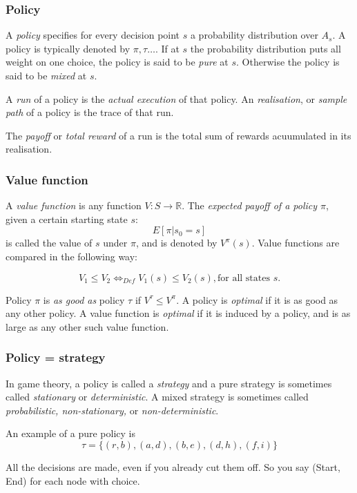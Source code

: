 \documentclass{article}
\begin{document}
\subsubsection{Policy}
A \emph{policy} specifies for every decision point $s$ a probability
distribution over $A_s$. A policy is typically denoted by $\pi, \tau\dots$.
If at $s$ the probability distribution puts all weight on one choice, the
policy is said to be \emph{pure} at $s$. Otherwise the policy is said to
be \emph{mixed} at $s$.

A \emph{run} of a policy is the \emph{actual execution} of that policy.
An \emph{realisation}, or \emph{sample path} of a policy is the trace of
that run.

The \emph{payoff} or \emph{total reward} of a run is the total sum of rewards
acuumulated in its realisation.

\subsubsection{Value function}
A \emph{value function} is any function $V: S \to \mathbb{R}$. The
\emph{expected payoff of a policy $\pi$}, given a certain starting state $s$:
	\[E[\pi|s_0=s]\]
	is called the value of $s$ under $\pi$, and is denoted by $V^\pi(s)$.
Value functions are compared in the following way:

\[ V_1 \le V_2 \Leftrightarrow_{Def} V_1(s) \le V_2(s), \mbox{for all states } s.\]

Policy $\pi$ is \emph{as good as} policy $\tau$ if $V^\tau \le V^\pi$. A policy
is \emph{optimal} if it is as good as any other policy. A value function is
\emph{optimal} if it is induced by a policy, and is as large as any other
such value function.

\subsubsection{Policy = strategy}
In game theory, a policy is called a \emph{strategy} and a pure strategy is
sometimes called \emph{stationary} or \emph{deterministic}. A mixed strategy
is sometimes called \emph{probabilistic, non-stationary,} or
\emph{non-deterministic}.

An example of a pure policy is
\[ \tau = \{(r,b),(a,d),(b,e),(d,h),(f,i)\} \]

All the decisions are made, even if you already cut them off.
So you say (Start, End) for each node with choice.
\end{document}
